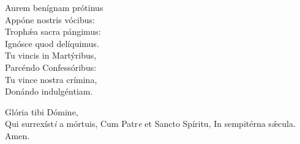 Aurem benígnam prótinus\\
Appóne nostris vócibus:\\
Trophǽa sacra pángimus:\\
Ignósce quod delíquimus.\\

Tu vincis in Martýribus,\\
Parcéndo Confessóribus:\\
Tu vince nostra crímina,\\
Donándo indulgéntiam.

Glória tibi Dómine,\\
Qui surrexíst\textit{i} a mórtuis,
Cum Patr\textit{e} et Sa\-ncto Spíritu,
In sempitérna sǽcula.
Amen.